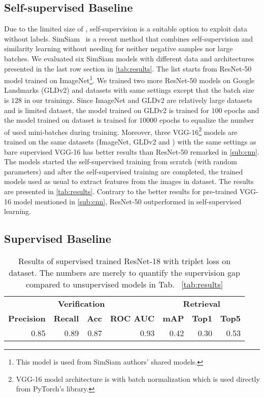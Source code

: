 \documentclass[a4paper,conference]{IEEEtran}
\begin{document}
\subsection{Self-supervised Baseline}
\label{sub:self}
Due to the limited size of \amstertime, self-supervision is a suitable option to exploit data without labels. SimSiam~\cite{chen2020simsiam} is a recent method that combines self-supervision and similarity learning without needing for neither negative samples nor large batches. We evaluated six SimSiam models with different data and architectures presented in the last row section in \cref{tab:results}. The list starts from ResNet-50 model trained on ImageNet\footnote{This model is used from SimSiam authors' shared models.}. We trained two more ResNet-50 models on Google Landmarks (GLDv2) and \amstertime datasets with same settings except that the batch size is $128$ in our trainings. Since ImageNet and GLDv2 are relatively large datasets and \amstertime is limited dataset, the model trained on GLDv2 is trained for $100$ epochs and the model trained on \amstertime dataset is trained for $10000$ epochs to equalize the number of used mini-batches during training. Moreover, three VGG-16\footnote{VGG-16 model architecture is with batch normalization which is used directly from PyTorch's library.} models are trained on the same datasets (ImageNet, GLDv2 and \amstertime) with the same settings as bare supervised VGG-16 has better results than ResNet-50 remarked in \cref{sub:cnn}. The models started the self-supervised training from scratch (with random parameters) and after the self-supervised training are completed, the trained models used as usual to extract features from the images in \amstertime dataset. The results are presented in \cref{tab:results}. Contrary to the better results for pre-trained VGG-16 model mentioned in \cref{sub:cnn}, ResNet-50 outperformed in self-supervised learning.


\subsection{Supervised Baseline}
\label{sub:supervision}

\begin{table}
\caption{Results of supervised trained ResNet-18 with triplet loss \cite{balntas2016learning} on \amstertime dataset. The numbers are merely to quantify the supervision gap compared to unsupervised models in Tab.~ \ref{tab:results}  }
\label{tab:supervised_results}
\centering
\begin{tabular}{rrrrrrr} \toprule
\multicolumn{4}{c}{\textbf{Verification}} & \multicolumn{3}{c}{\textbf{Retrieval}} \\
\cmidrule(r){1-4} \cmidrule(l){5-7}
\textbf{Precision} & \textbf{Recall} & \textbf{Acc} & \textbf{ROC AUC} & \textbf{mAP} & \textbf{Top1} & \textbf{Top5} \\ \midrule
0.85 & 0.89 & 0.87 & 0.93 & 0.42 & 0.30 & 0.53 \\ \bottomrule
\end{tabular}
\end{table}
\end{document}
